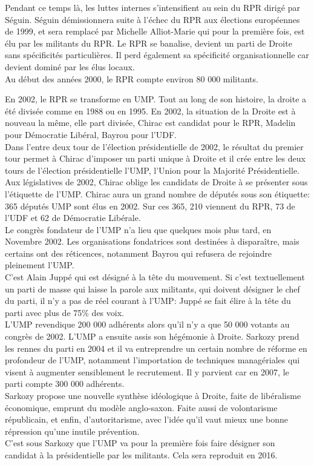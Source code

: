 \documentclass[10pt, a4paper, openany]{book}
\begin{document}
Pendant ce temps là, les luttes internes s'intensifient au sein du RPR dirigé par Séguin. Séguin démissionnera suite à l'échec du RPR aux élections européennes de 1999, et sera remplacé par Michelle Alliot-Marie qui pour la première fois, est élu par les militants du RPR. Le RPR se banalise, devient un parti de Droite sans spécificités particulières. Il perd également sa spécificité organisationnelle car devient dominé par les élus locaux. \\
Au début des années 2000, le RPR compte environ 80 000 militants. 


En 2002, le RPR se transforme en UMP. Tout au long de son histoire, la droite a été divisée comme en 1988 ou en 1995. En 2002, la situation de la Droite est à nouveau la même, elle part divisée, Chirac est candidat pour le RPR, Madelin pour Démocratie Libéral, Bayrou pour l'UDF. \\
Dans l'entre deux tour de l'élection présidentielle de 2002, le résultat du premier tour permet à Chirac d'imposer un parti unique à Droite et il crée entre les deux tours de l'élection présidentielle l'UMP, l'Union pour la Majorité Présidentielle. \\
Aux législatives de 2002, Chirac oblige les candidats de Droite à se présenter sous l'étiquette de l'UMP. Chirac aura un grand nombre de députés sous son étiquette: 365 députés UMP sont élus en 2002. Sur ces 365, 210 viennent du RPR, 73 de l'UDF et 62 de Démocratie Libérale. \\
Le congrès fondateur de l'UMP n'a lieu que quelques mois plus tard, en Novembre 2002. Les organisations fondatrices sont destinées à disparaître, mais certains ont des réticences, notamment Bayrou qui refusera de rejoindre pleinement l'UMP. \\
C'est Alain Juppé qui est désigné à la tête du mouvement. Si c'est textuellement un parti de masse qui laisse la parole aux militants, qui doivent désigner le chef du parti, il n'y a pas de réel courant à l'UMP: Juppé se fait élire à la tête du parti avec plus de 75\% des voix. \\
L'UMP revendique 200 000 adhérents alors qu'il n'y a que 50 000 votants au congrès de 2002. L'UMP a ensuite assis son hégémonie à Droite. Sarkozy prend les rennes du parti en 2004 et il va entreprendre un certain nombre de réforme en profondeur de l'UMP, notamment l'importation de techniques managériales qui visent à augmenter sensiblement le recrutement. Il y parvient car en 2007, le parti compte 300 000 adhérents. \\
Sarkozy propose une nouvelle synthèse idéologique à Droite, faite de libéralisme économique, emprunt du modèle anglo-saxon. Faite aussi de volontarisme républicain, et enfin, d'autoritarisme, avec l'idée qu'il vaut mieux une bonne répression qu'une inutile prévention. \\
C'est sous Sarkozy que l'UMP va pour la première fois faire désigner son candidat à la présidentielle par les militants. Cela sera reproduit en 2016.  
\end{document}
